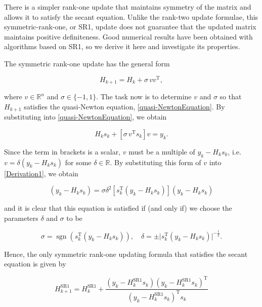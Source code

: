 There is a simpler rank-one
update that maintains symmetry of the matrix and allows it to satisfy the secant equation.
Unlike the rank-two update formulae, this symmetric-rank-one, or SR1, update does not
guarantee that the updated matrix maintains positive definiteness. Good numerical results
have been obtained with algorithms based on SR1, so we derive it here and investigate its
properties.

The symmetric rank-one update has the general form

\begin{equation*}
    H_{k+1} = H_k + \sigma \, v v^{\mathrm{T}},
\end{equation*}

where $v \in \mathbb{R}^n$ and $\sigma \in \{-1,1\}$. The task now is to determine $v$ and $\sigma$ so that $H_{k+1}$ satisfies the quasi-Newton equation, \cref{quasi-NewtonEquation}. By substituting into \cref{quasi-NewtonEquation}, we obtain

\begin{equation}\label{Derivation1}
    H_k s_k + [\sigma \, v^{\mathrm{T}} s_k] v = y_k.
\end{equation}

Since the term in brackets is a scalar, $v$ must be a multiple of $y_k − H_k s_k$, i.e. $v = \delta (y_k − H_k s_k)$ for some $\delta \in \mathbb{R}$. By substituting this form of $v$ into \cref{Derivation1}, we obtain

\begin{equation}\label{Derivation2}
    (y_k − H_k s_k) = \sigma \delta^2 [s^{\mathrm{T}}_k (y_k − H_k s_k)](y_k − H_k s_k)
\end{equation}

and it is clear that this equation is satisfied if (and only if) we choose the parameters $\delta$ and $\sigma$ to be

\begin{equation*}
    \sigma = \operatorname{sgn} (s^{\mathrm{T}}_k (y_k − H_k s_k)), \quad \delta = \pm \lvert s^{\mathrm{T}}_k (y_k − H_k s_k) \rvert^{-\frac{1}{2}}.
\end{equation*}

Hence, the only symmetric rank-one updating formula that satisfies the secant equation is given by

\begin{equation}\label{directSR1formula}
    H^\mathrm{SR1}_{k+1} = H^\mathrm{SR1}_k + \frac{(y_k - H^\mathrm{SR1}_k s_k) (y_k - H^\mathrm{SR1}_k s_k)^{\mathrm{T}}}{(y_k - H^\mathrm{SR1}_k s_k)^{\mathrm{T}} s_k}
\end{equation}

